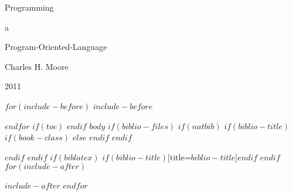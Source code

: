 \documentclass[10pt,letterpaper]{memoir}
\begin{document}
    \thispagestyle{empty}
    \vspace*{\fill}
    \begin{center}
    \HUGE\textsf{Programming}\par
    \end{center}
    \begin{center}
    \LARGE\textsf{a}\par
    \end{center}
    \begin{center}
    \HUGE\textsf{Program-Oriented-Language}\par
    \end{center}

    \begin{center}
    \Huge\textsf{}\par
    \end{center}
    \begin{center}
    \LARGE\textsf{Charles H. Moore}\par
    \textrm{\normalsize 2011} \\
    \end{center}
    \vspace*{\fill}
    \begin{center}
    \end{center}
    \clearpage


$for(include-before)$
$include-before$

$endfor$
$if(toc)$
\tableofcontents
\thispagestyle{empty}
\clearpage
{}
\setcounter{page}{1}
$endif$
$body$
$if(biblio-files)$
$if(natbib)$
$if(biblio-title)$
$if(book-class)$
\renewcommand\bibname{$biblio-title$}
$else$
\renewcommand\refname{$biblio-title$}
$endif$
$endif$

$endif$
$endif$
$if(biblatex)$
\printbibliography$if(biblio-title)$[title=$biblio-title$]$endif$
$endif$
$for(include-after)$

$include-after$
$endfor$
\end{document}
